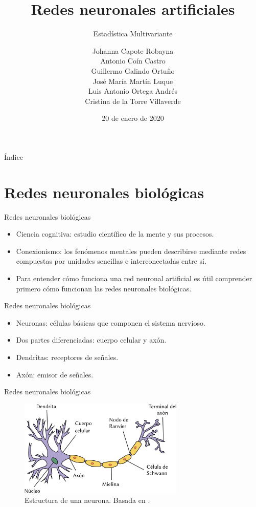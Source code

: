 \documentclass[spanish]{beamer}
\title{Redes neuronales artificiales}
\subtitle{Estadística Multivariante}
\author{
  Johanna Capote Robayna\texorpdfstring{\\}{}
  Antonio Coín Castro\texorpdfstring{\\}{}
  Guillermo Galindo Ortuño\texorpdfstring{\\}{}
  José María Martín Luque\texorpdfstring{\\}{}
  Luis Antonio Ortega Andrés\texorpdfstring{\\}{}
  Cristina de la Torre Villaverde
}
\institute{\normalsize Universidad de Granada}
\date{20 de enero de 2020}
\begin{document}
\maketitle

\begin{frame}{Índice}
  \tableofcontents
\end{frame}

\section{Redes neuronales biológicas}

\begin{frame}{Redes neuronales biológicas}
  \begin{itemize}
    \item Ciencia cognitiva: estudio científico de la mente y sus procesos.
    \item Conexionismo: los fenómenos mentales pueden describirse mediante redes compuestas por unidades sencillas e interconectadas entre sí.
    \item Para entender cómo funciona una red neuronal artificial es útil comprender primero cómo funcionan las redes neuronales biológicas.
  \end{itemize}
\end{frame}

\begin{frame}{Redes neuronales biológicas}
  \begin{itemize}
    \item Neuronas: células básicas que componen el sistema nervioso.
    \item Dos partes diferenciadas: cuerpo celular y axón.
    \item Dendritas: receptores de señales.
    \item Axón: emisor de señales.
  \end{itemize}
\end{frame}

\begin{frame}{Redes neuronales biológicas}
  \begin{figure}[b]
    \centering
    \includegraphics[width=0.7\textwidth]{img/neurona}
    \caption{Estructura de una neurona. Basada en \parencite{dhp1080_neurona_2007}.}
    \label{fig:neurona}
  \end{figure}
\end{frame}
\end{document}
